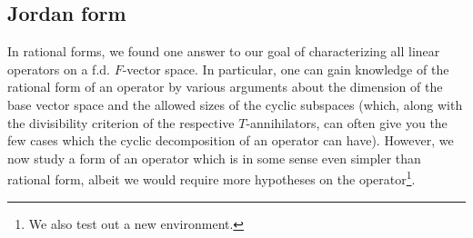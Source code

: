 \documentclass[letterpaper,11pt,twoside]{article}
\theoremstyle{definition}
\theoremstyle{definition}
\theoremstyle{definition}
\theoremstyle{definition}
\theoremstyle{definition}
\theoremstyle{definition}
\theoremstyle{remark}
\theoremstyle{definition}
\begin{document}
    \subsection{Jordan form}
    In rational forms, we found one answer to our goal of characterizing all linear operators on a f.d. $ F $-vector space. In particular, one can gain knowledge of the rational form of an operator by various arguments about the dimension of the base vector space and the allowed sizes of the cyclic subspaces (which, along with the divisibility criterion of the respective $ T $-annihilators, can often give you the few cases which the cyclic decomposition of an operator can have). However, we now study a form of an operator which is in some sense even simpler than rational form, albeit we would require more hypotheses on the operator\footnote{We also test out a new environment.}.
\end{document}
